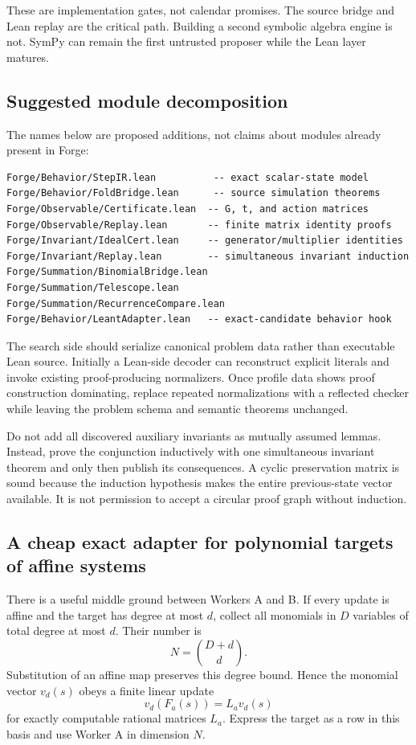 These are implementation gates, not calendar promises. The source bridge and
Lean replay are the critical path. Building a second symbolic algebra engine is
not. SymPy can remain the first untrusted proposer while the Lean layer matures.

\subsection{Suggested module decomposition}

The names below are proposed additions, not claims about modules already
present in Forge:
\begin{lstlisting}
Forge/Behavior/StepIR.lean          -- exact scalar-state model
Forge/Behavior/FoldBridge.lean      -- source simulation theorems
Forge/Observable/Certificate.lean  -- G, t, and action matrices
Forge/Observable/Replay.lean       -- finite matrix identity proofs
Forge/Invariant/IdealCert.lean     -- generator/multiplier identities
Forge/Invariant/Replay.lean        -- simultaneous invariant induction
Forge/Summation/BinomialBridge.lean
Forge/Summation/Telescope.lean
Forge/Summation/RecurrenceCompare.lean
Forge/Behavior/LeantAdapter.lean   -- exact-candidate behavior hook
\end{lstlisting}

The search side should serialize canonical problem data rather than executable
Lean source. Initially a Lean-side decoder can reconstruct explicit literals
and invoke existing proof-producing normalizers. Once profile data shows proof
construction dominating, replace repeated normalizations with a reflected
checker while leaving the problem schema and semantic theorems unchanged.

Do not add all discovered auxiliary invariants as mutually assumed lemmas.
Instead, prove the conjunction inductively with one simultaneous invariant
theorem and only then publish its consequences. A cyclic preservation matrix is
sound because the induction hypothesis makes the entire previous-state vector
available. It is not permission to accept a circular proof graph without
induction.

\subsection{A cheap exact adapter for polynomial targets of affine systems}

There is a useful middle ground between Workers A and B. If every update is
affine and the target has degree at most $d$, collect all monomials in $D$
variables of total degree at most $d$. Their number is
\[
 N=\binom{D+d}{d}.
\]
Substitution of an affine map preserves this degree bound. Hence the monomial
vector $v_d(s)$ obeys a finite linear update
\[
 v_d(F_a(s))=L_av_d(s)
\]
for exactly computable rational matrices $L_a$. Express the target as a row in
this basis and use Worker A in dimension $N$.


